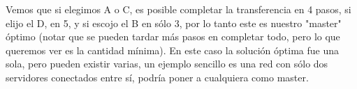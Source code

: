 Vemos que si elegimos A o C, es posible completar la transferencia en 4 pasos, si elijo el D, en 5, y si escojo el B en sólo 3, por lo tanto este es nuestro "master"  óptimo (notar que se pueden tardar más pasos en completar todo, pero lo que queremos ver es la cantidad mínima).
En este caso la solución óptima fue una sola, pero pueden existir varias, un ejemplo sencillo es una red con sólo dos servidores conectados entre sí, podría poner a cualquiera como master.